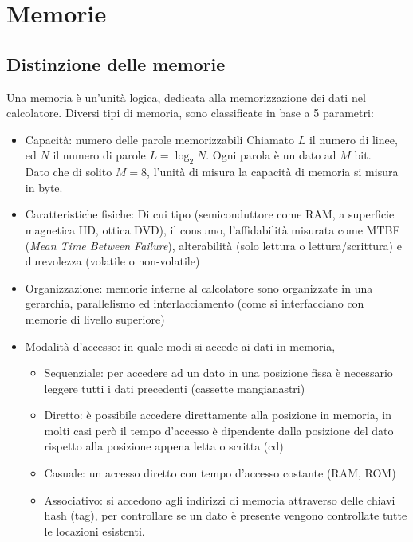 \documentclass[../template]{subfiles}
\begin{document}
\section{Memorie}
\subsection{Distinzione delle memorie}
Una memoria è un'unità logica, dedicata alla memorizzazione dei dati nel calcolatore.
Diversi tipi di memoria, sono classificate in base a 5 parametri:
\begin{itemize}
    \item Capacità: numero delle parole memorizzabili
        Chiamato $L$ il numero di linee, ed $N$ il numero di parole $L =\log_2 N$.
        Ogni parola è un dato ad $M$ bit.
        \\
        Dato che di solito $M = 8$, l'unità di misura la capacità di memoria si misura in byte.
    \item Caratteristiche fisiche:
        Di cui tipo (semiconduttore come RAM, a superficie magnetica HD, ottica DVD), il consumo,
        l'affidabilità misurata come MTBF (\textit{Mean Time Between Failure}), alterabilità (solo lettura o lettura/scrittura) e durevolezza (volatile o non-volatile)
    \item Organizzazione:
        memorie interne al calcolatore sono organizzate in una gerarchia,
        parallelismo ed interlacciamento (come si interfacciano con memorie di livello superiore)
    \item Modalità d'accesso: in quale modi si accede ai dati in memoria,
        \begin{itemize}
            \item Sequenziale: per accedere ad un dato in una posizione fissa è necessario leggere tutti i dati precedenti (cassette mangianastri)
            \item Diretto: è possibile accedere direttamente alla posizione in memoria, in molti casi però il tempo d'accesso è dipendente dalla posizione del dato rispetto alla posizione appena letta o scritta (cd)
            \item Casuale: un accesso diretto con tempo d'accesso costante (RAM, ROM)
            \item Associativo: si accedono agli indirizzi di memoria attraverso delle chiavi hash (tag), per controllare se un dato è presente vengono controllate tutte le locazioni esistenti.
        \end{itemize}


\end{itemize}
\end{document}
